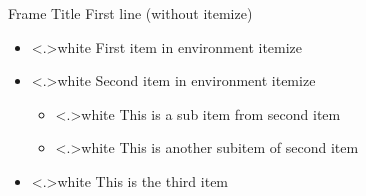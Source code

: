 \begin{frame}{Frame Title}
    First line (without itemize)
    \pause
    \begin{slimcol}
    \begin{itemize}[<+->]\color{darkgray}
        \item \color<.>{white} First item in environment itemize
        \item \color<.>{white} Second item in environment itemize
        \begin{itemize}[<+->]\color{darkgray}
            \item \color<.>{white} This is a sub item from second item
            \item \color<.>{white} This is another subitem of second item
        \end{itemize}
        \item \color<.>{white} This is the third item
    \end{itemize}
    \end{slimcol}
\end{frame}

